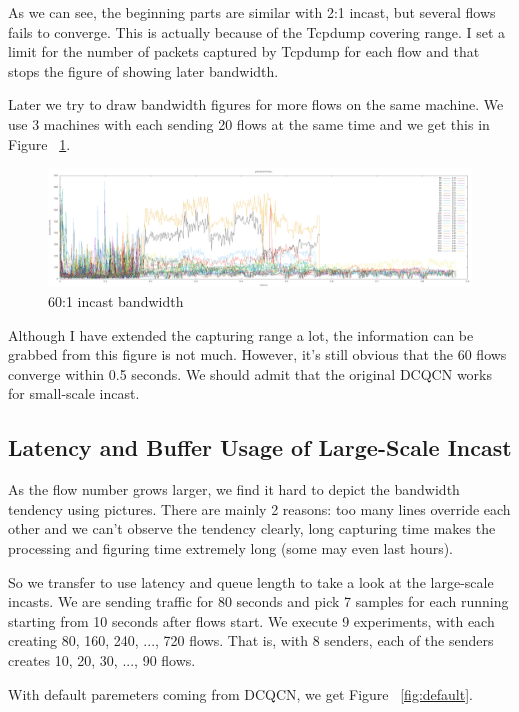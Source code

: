 \documentclass[12pt,a4paper]{article}
\begin{document}
As we can see, the beginning parts are similar with 2:1 incast, but several flows fails to converge.
This is actually because of the Tcpdump covering range.
I set a limit for the number of packets captured by Tcpdump for each flow and that stops the figure of showing later bandwidth.

Later we try to draw bandwidth figures for more flows on the same machine.
We use 3 machines with each sending 20 flows at the same time and we get this in Figure ~\ref{fig:3_20_0}.

\begin{figure}[ht]
	\begin{center}
		\includegraphics[width=6in]{3_20_0}
		\caption{60:1 incast bandwidth}
		\label{fig:3_20_0}
	\end{center}
\end{figure}

Although I have extended the capturing range a lot, the information can be grabbed from this figure is not much.
However, it's still obvious that the 60 flows converge within 0.5 seconds.
We should admit that the original DCQCN works for small-scale incast.

\subsection{Latency and Buffer Usage of Large-Scale Incast}
As the flow number grows larger, we find it hard to depict the bandwidth tendency using pictures.
There are mainly 2 reasons: too many lines override each other and we can't observe the tendency clearly, 
long capturing time makes the processing and figuring time extremely long (some may even last hours).

So we transfer to use latency and queue length to take a look at the large-scale incasts.
We are sending traffic for 80 seconds and pick 7 samples for each running starting from 10 seconds after flows start.
We execute 9 experiments, with each creating 80, 160, 240, ..., 720 flows.
That is, with 8 senders, each of the senders creates 10, 20, 30, ..., 90 flows.

With default paremeters coming from DCQCN, we get Figure ~\ref{fig:default}.
\end{document}
